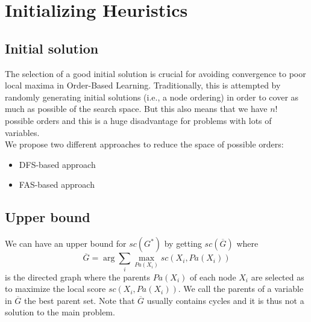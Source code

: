 \section{Initializing Heuristics}

\subsection{Initial solution}
	\begin{frame}
		The selection of a good initial solution is crucial for avoiding convergence to poor local maxima in Order-Based Learning. Traditionally, this is attempted by randomly generating initial solutions (i.e., a node ordering) in order to cover as much as possible of the search space. But this also means that we have $n!$ possible orders and this is a huge disadvantage for problems with lots of variables.\\
		We propose two different approaches to reduce the space of possible orders:
		\begin{itemize}
			\item DFS-based approach
			\item FAS-based approach
		\end{itemize}
	\end{frame}

\subsection{Upper bound}
	\begin{frame}
		We can have an upper bound for ${sc}( G^* )$ by getting ${sc}( \overline G )$ where
			\[ \overline{G} = \arg \sum_i \max_{{Pa}(X_i)} sc( X_i, {Pa}( X_i ) ) \]
		is the directed graph where the parents ${Pa}( X_i )$ of each node $X_i$ are selected as to maximize the local score ${sc}( X_i , {Pa}( X_i ) )$. We call the parents of a variable in $\overline G$ the \alert{best parent set}. Note that $\overline G$ usually contains cycles and it is thus not a solution to the main problem.
	\end{frame}
	
